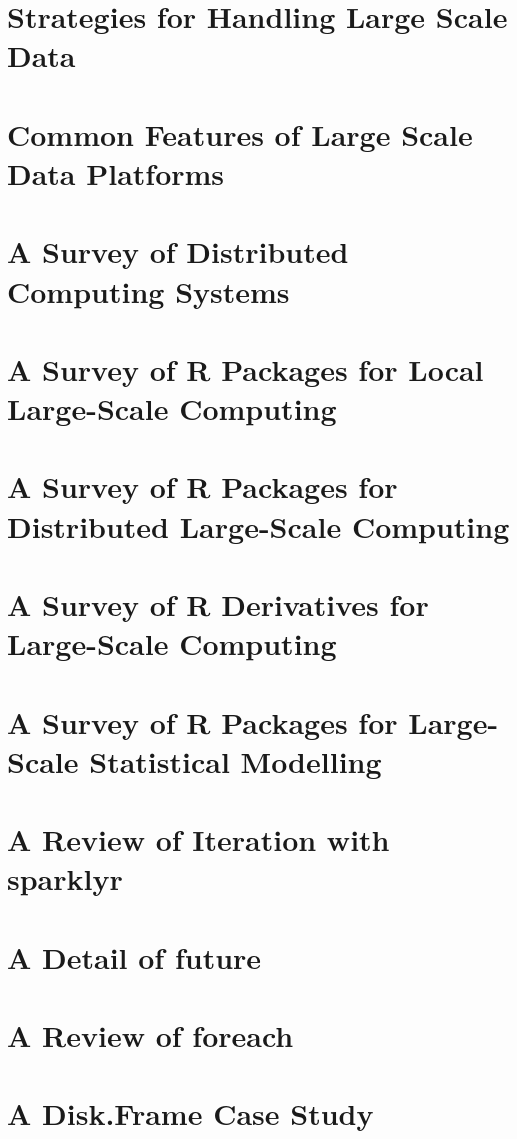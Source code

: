 \documentclass[11pt,a4paper,partial,examcopy]{aucklandthesis} %
\begin{document}
\section{Strategies for Handling Large Scale Data}

\section{Common Features of Large Scale Data Platforms}

\section{A Survey of Distributed Computing Systems}

\section{A Survey of R Packages for Local Large-Scale Computing}

\section{A Survey of R Packages for Distributed Large-Scale Computing}

\section{A Survey of R Derivatives for Large-Scale Computing}

\section{A Survey of R Packages for Large-Scale Statistical Modelling}

\section{A Review of Iteration with sparklyr}

\section{A Detail of future}

\section{A Review of foreach}

\section{A Disk.Frame Case Study}

\end{document}
